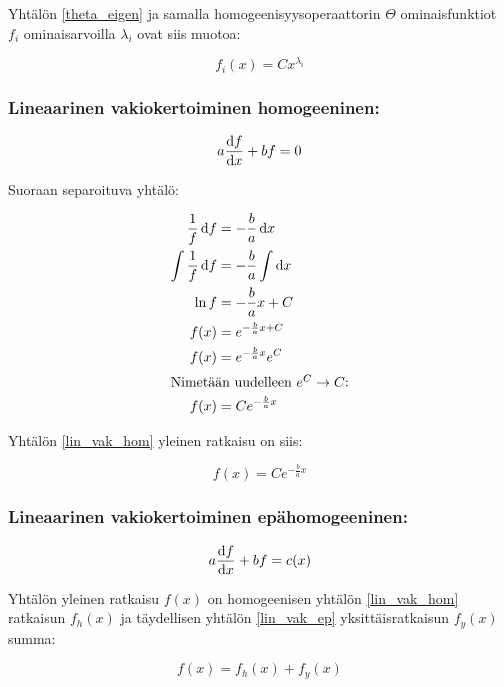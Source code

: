 \documentclass[../johdoksia.tex]{subfiles}
\begin{document}
	Yhtälön \ref{theta_eigen} ja samalla homogeenisyysoperaattorin $\Theta$ ominaisfunktiot $f_i$ ominaisarvoilla $\lambda_i$ ovat siis muotoa:
	
	\begin{equation}
		\boxed{f_i(x) = Cx^{\lambda_i}}
	\end{equation}
	
	\subsubsection{Lineaarinen vakiokertoiminen homogeeninen:}
	
	\begin{equation}
		\label{lin_vak_hom}
		a\odv{f}{x} + bf = 0
	\end{equation}
	
	Suoraan separoituva yhtälö:
	
	\begin{align*}
		\frac{1}{f}\odif{f} &= -\frac{b}{a}\odif{x} \\
		\int\frac{1}{f}\odif{f} &= -\frac{b}{a}\int\odif{x} \\
		\ln f &= -\frac{b}{a}x + C \\
		f(x) &= e^{-\frac{b}{a}x + C} \\
		f(x) &= e^{-\frac{b}{a}x}e^C \\
		\intertext{Nimetään uudelleen $e^C \to C$:}
		f(x) &= Ce^{-\frac{b}{a}x}
	\end{align*}
	
	Yhtälön \ref{lin_vak_hom} yleinen ratkaisu on siis:
	
	\begin{equation}
		\boxed{f(x) = Ce^{-\frac{b}{a}x}}
	\end{equation}
	
	
	\subsubsection{Lineaarinen vakiokertoiminen epähomogeeninen:}
	
	\begin{equation}
		\label{lin_vak_ep}
		a\odv{f}{x} + bf = c(x)
	\end{equation}
	
	Yhtälön yleinen ratkaisu $f(x)$ on homogeenisen yhtälön \ref{lin_vak_hom} ratkaisun $f_h(x)$ ja täydellisen yhtälön \ref{lin_vak_ep} yksittäisratkaisun $f_y(x)$ summa:
	
	\begin{equation*}
		f(x) = f_{h}(x) + f_{y}(x)
	\end{equation*}
	
\end{document}
